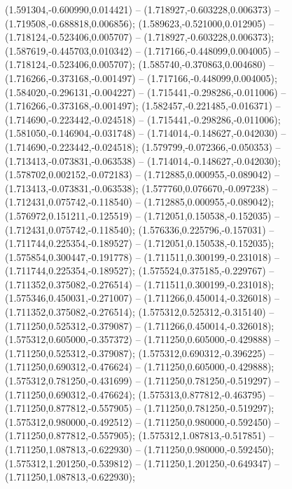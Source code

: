  (1.591304,-0.600990,0.014421) -- (1.718927,-0.603228,0.006373) -- (1.719508,-0.688818,0.006856);
 (1.589623,-0.521000,0.012905) -- (1.718124,-0.523406,0.005707) -- (1.718927,-0.603228,0.006373);
 (1.587619,-0.445703,0.010342) -- (1.717166,-0.448099,0.004005) -- (1.718124,-0.523406,0.005707);
 (1.585740,-0.370863,0.004680) -- (1.716266,-0.373168,-0.001497) -- (1.717166,-0.448099,0.004005);
 (1.584020,-0.296131,-0.004227) -- (1.715441,-0.298286,-0.011006) -- (1.716266,-0.373168,-0.001497);
 (1.582457,-0.221485,-0.016371) -- (1.714690,-0.223442,-0.024518) -- (1.715441,-0.298286,-0.011006);
 (1.581050,-0.146904,-0.031748) -- (1.714014,-0.148627,-0.042030) -- (1.714690,-0.223442,-0.024518);
 (1.579799,-0.072366,-0.050353) -- (1.713413,-0.073831,-0.063538) -- (1.714014,-0.148627,-0.042030);
 (1.578702,0.002152,-0.072183) -- (1.712885,0.000955,-0.089042) -- (1.713413,-0.073831,-0.063538);
 (1.577760,0.076670,-0.097238) -- (1.712431,0.075742,-0.118540) -- (1.712885,0.000955,-0.089042);
 (1.576972,0.151211,-0.125519) -- (1.712051,0.150538,-0.152035) -- (1.712431,0.075742,-0.118540);
 (1.576336,0.225796,-0.157031) -- (1.711744,0.225354,-0.189527) -- (1.712051,0.150538,-0.152035);
 (1.575854,0.300447,-0.191778) -- (1.711511,0.300199,-0.231018) -- (1.711744,0.225354,-0.189527);
 (1.575524,0.375185,-0.229767) -- (1.711352,0.375082,-0.276514) -- (1.711511,0.300199,-0.231018);
 (1.575346,0.450031,-0.271007) -- (1.711266,0.450014,-0.326018) -- (1.711352,0.375082,-0.276514);
 (1.575312,0.525312,-0.315140) -- (1.711250,0.525312,-0.379087) -- (1.711266,0.450014,-0.326018);
 (1.575312,0.605000,-0.357372) -- (1.711250,0.605000,-0.429888) -- (1.711250,0.525312,-0.379087);
 (1.575312,0.690312,-0.396225) -- (1.711250,0.690312,-0.476624) -- (1.711250,0.605000,-0.429888);
 (1.575312,0.781250,-0.431699) -- (1.711250,0.781250,-0.519297) -- (1.711250,0.690312,-0.476624);
 (1.575313,0.877812,-0.463795) -- (1.711250,0.877812,-0.557905) -- (1.711250,0.781250,-0.519297);
 (1.575312,0.980000,-0.492512) -- (1.711250,0.980000,-0.592450) -- (1.711250,0.877812,-0.557905);
 (1.575312,1.087813,-0.517851) -- (1.711250,1.087813,-0.622930) -- (1.711250,0.980000,-0.592450);
 (1.575312,1.201250,-0.539812) -- (1.711250,1.201250,-0.649347) -- (1.711250,1.087813,-0.622930);
